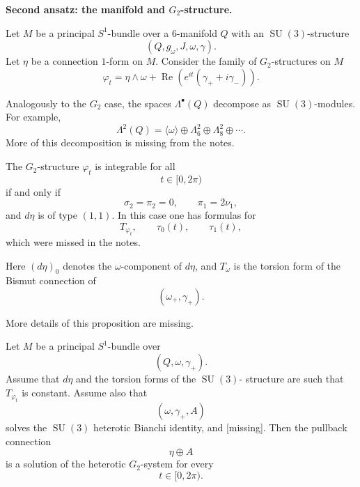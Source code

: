 \medskip\noindent
{\bf Second ansatz: the manifold and
$G_2$-structure.}

Let $M$ be a principal $S^1$-bundle
over a $6$-manifold $Q$ with an
$\operatorname{SU}(3)$-structure
\[
        (Q,g_\omega,J,\omega,\gamma).
\]
Let $\eta$ be a connection $1$-form
on $M$.
Consider the family of
$G_2$-structures on $M$
\[
        \varphi_t
        =
        \eta\wedge\omega
        +
        \operatorname{Re}
        \left(
        e^{it}(\gamma_+
        + i\gamma_-)
        \right).
\]

Analogously to the $G_2$ case, the
spaces $\Lambda^\bullet(Q)$ decompose
as $\operatorname{SU}(3)$-modules.
For example,
\[
        \Lambda^2(Q)
        =
        \langle\omega\rangle
        \oplus
        \Lambda^2_6
        \oplus
        \Lambda^2_8
        \oplus\cdots .
\]
More of this decomposition is missing
from the notes.

\begin{proposition}
\label{proposition-g-2}
The $G_2$-structure $\varphi_t$ is
integrable for all
\[
        t\in[0,2\pi)
\]
if and only if
\[
        \sigma_2=\pi_2=0,
        \qquad
        \pi_1=2\nu_1,
\]
and $d\eta$ is of type $(1,1)$.
In this case one has formulas for
\[
        T_{\varphi_t},
        \qquad
        \tau_0(t),
        \qquad
        \tau_1(t),
\]
which were missed in the notes.
\end{proposition}

Here $(d\eta)_0$ denotes the
$\omega$-component of $d\eta$, and
$T_\omega$ is the torsion form of the
Bismut connection of
\[
        (\omega_+,\gamma_+).
\]

\begin{remark}
\label{remark-more-details}
More details of this proposition are
missing.
\end{remark}

\begin{theorem}
\label{theorem-let-m6}
Let $M$ be a principal $S^1$-bundle
over
\[
        (Q,\omega,\gamma_+).
\]
Assume that $d\eta$ and the torsion
forms of the $\operatorname{SU}(3)$-
structure are such that
$T_{\varphi_t}$ is constant.
Assume also that
\[
        (\omega,\gamma_+,A)
\]
solves the $\operatorname{SU}(3)$
heterotic Bianchi identity, and
[missing].
Then the pullback connection
\[
        \eta\oplus A
\]
is a solution of the heterotic
$G_2$-system for every
\[
        t\in[0,2\pi).
\]
\end{theorem}

